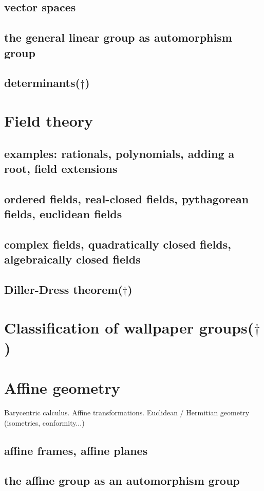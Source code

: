 \section{vector spaces}
\section{the general linear group as automorphism group}
\section{determinants($\dagger$)}
\chapter{Field theory}
\section{examples: rationals, polynomials, adding a root, field extensions}
\section{ordered fields, real-closed fields, pythagorean fields, euclidean fields}
\section{complex fields, quadratically closed fields, algebraically closed fields}
\section{Diller-Dress theorem($\dagger$)}
\chapter{Classification of wallpaper groups($\dagger$)}
\chapter{Affine geometry}
Barycentric calculus. Affine transformations. Euclidean / Hermitian geometry (isometries, conformity...)
\section{affine frames, affine planes}
\section{the affine group as an automorphism group}
